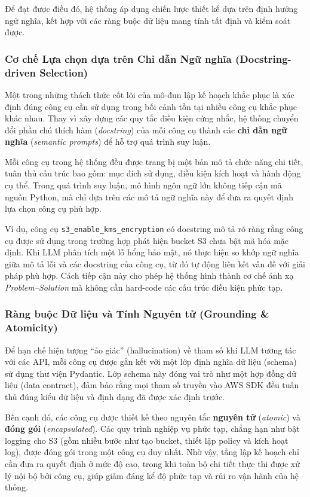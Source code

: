 Để đạt được điều đó,
hệ thống áp dụng
chiến lược thiết kế
dựa trên định hướng ngữ nghĩa,
kết hợp với các ràng buộc dữ liệu
mang tính tất định và kiểm soát được.

\subsubsection*{Cơ chế Lựa chọn dựa trên Chỉ dẫn Ngữ nghĩa (Docstring-driven Selection)}

Một trong những thách thức cốt lõi
của mô-đun lập kế hoạch khắc phục
là xác định đúng công cụ cần sử dụng
trong bối cảnh tồn tại
nhiều công cụ khắc phục khác nhau.
Thay vì xây dựng
các quy tắc điều kiện cứng nhắc,
hệ thống chuyển đổi
phần chú thích hàm
(\textit{docstring})
của mỗi công cụ
thành các \textbf{chỉ dẫn ngữ nghĩa}
(\textit{semantic prompts})
để hỗ trợ quá trình suy luận.

Mỗi công cụ trong hệ thống
đều được trang bị
một bản mô tả chức năng chi tiết,
tuân thủ cấu trúc bao gồm:
mục đích sử dụng,
điều kiện kích hoạt
và hành động cụ thể.
Trong quá trình suy luận,
mô hình ngôn ngữ lớn
không tiếp cận
mã nguồn Python,
mà chỉ dựa trên
các mô tả ngữ nghĩa này
để đưa ra quyết định
lựa chọn công cụ phù hợp.

Ví dụ, công cụ \texttt{s3\_enable\_kms\_encryption} có docstring mô tả rõ ràng rằng công cụ được sử dụng trong trường hợp phát hiện bucket S3 chưa bật mã hóa mặc định. Khi LLM phân tích một lỗ hổng bảo mật, nó thực hiện so khớp ngữ nghĩa giữa mô tả lỗi và các docstring của công cụ, từ đó tự động liên kết vấn đề với giải pháp phù hợp. Cách tiếp cận này cho phép hệ thống hình thành cơ chế ánh xạ \textit{Problem--Solution} mà không cần hard-code các cấu trúc điều kiện phức tạp.

\subsubsection*{Ràng buộc Dữ liệu và Tính Nguyên tử (Grounding \& Atomicity)}

Để hạn chế hiện tượng ``ảo giác'' (hallucination) về tham số khi LLM tương tác với các API, mỗi công cụ được gắn kết với một lớp định nghĩa dữ liệu (schema) sử dụng thư viện Pydantic. Lớp schema này đóng vai trò như một hợp đồng dữ liệu (data contract), đảm bảo rằng mọi tham số truyền vào AWS SDK đều tuân thủ đúng kiểu dữ liệu và định dạng đã được xác định trước.

Bên cạnh đó,
các công cụ
được thiết kế
theo nguyên tắc
\textbf{nguyên tử}
(\textit{atomic})
và
\textbf{đóng gói}
(\textit{encapsulated}).
Các quy trình nghiệp vụ phức tạp,
chẳng hạn như
bật logging cho S3
(gồm nhiều bước
  như tạo bucket,
  thiết lập policy
và kích hoạt log),
được đóng gói
trong một công cụ duy nhất. Nhờ vậy,
tầng lập kế hoạch
chỉ cần
đưa ra quyết định
ở mức độ cao,
trong khi toàn bộ
chi tiết thực thi
được xử lý nội bộ
bởi công cụ,
giúp giảm đáng kể
độ phức tạp
và rủi ro vận hành
của hệ thống.

